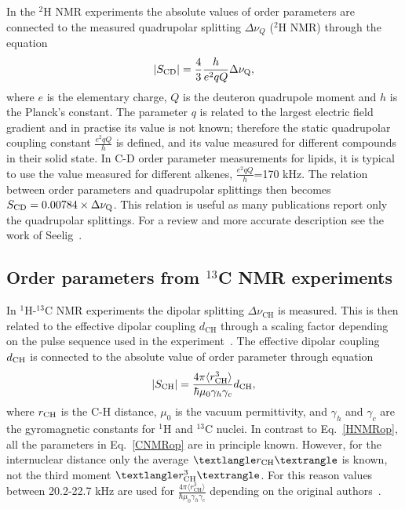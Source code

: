 \documentclass[aps,prl,superscriptaddress,twocolumn]{revtex4}
\begin{document}
In the $^2$H NMR experiments the absolute values of order parameters are connected to the measured quadrupolar 
splitting $\Delta \nu_Q$ ($^2$H NMR) through the equation 
\begin{equation}\label{HNMRop}
|S_{{\rm CD}}|=\frac{4}{3} \frac{h}{e^2qQ} \Delta \nu_{{\rm Q}}, 
\end{equation}
where $e$ is the elementary charge, $Q$ is the deuteron quadrupole moment and $h$ is the Planck's constant. 
The parameter $q$ is related to the largest electric field gradient and in practise its value is not known; 
therefore the static quadrupolar coupling constant $\frac{e^2qQ}{h}$ is defined, and its value measured for 
different compounds in their solid state. In C-D order parameter measurements for lipids, it is typical to 
use the value  measured for different alkenes, $\frac{e^2qQ}{h}$=170 kHz. The relation between order parameters 
and quadrupolar splittings then becomes $S_{{\rm CD}}=0.00784 \times \Delta \nu_{{\rm Q}}$.
This relation is useful as many publications report only the quadrupolar splittings. For a review and more accurate description see the work of Seelig~\cite{seelig77c}.

\subsection{Order parameters from $^{13}$C NMR experiments}

In $^1$H-$^{13}$C NMR experiments the dipolar splitting $\Delta \nu_\mathrm{CH}$  is measured. This is then related to
the effective dipolar coupling $d_\mathrm{CH}$ through a scaling factor depending on the pulse sequence used in the 
experiment~\cite{hong95a,gross97,dvinskikh05a,ferreira13}. The effective dipolar coupling $d_{{\rm CH}}$ is 
connected to the absolute value of order parameter through equation
\begin{equation}\label{CNMRop}
|S_{{\rm CH}}|=\frac{4\pi\langle r_\mathrm{CH}^3 \rangle}{\hbar \mu_0 \gamma_h \gamma_c} d_\mathrm{CH}, 
\end{equation}
where $r_{{\rm CH}}$ is the C-H distance, $\mu_0$ is the vacuum permittivity, and $\gamma_h$ and $\gamma_c$ are 
the gyromagnetic constants for $^1$H and $^{13}$C nuclei. In contrast to Eq.~\ref{HNMRop}, all the parameters in 
Eq.~\ref{CNMRop} are in principle known. However, for the internuclear distance only the average $⟨r_{{\rm CH}}⟩$ 
is known, not the third moment $⟨r^3_{{\rm CH}}⟩$. For this reason values between 20.2-22.7 kHz are used for
$\frac{4\pi\langle r_\mathrm{CH}^3 \rangle}{\hbar \mu_0 \gamma_h \gamma_c}$ depending on the original 
authors~\cite{hong95a,gross97,dvinskikh05a,ferreira13}.
\end{document}
